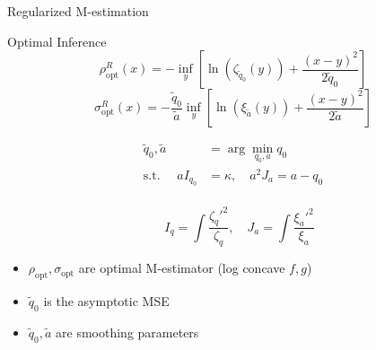 \documentclass[pdf]{beamer}
\begin{document}
\begin{frame}{Regularized M-estimation}

\begin{block}{Optimal Inference}
\begin{equation*}
 \rho_{\text{opt}}^R(x) =  -\inf_y{\left[ \ln(\zeta_{\tilde{q}_0}(y)) + \frac{(x-y)^2}{2 \tilde{q}_0}\right]}
\end{equation*}
\begin{equation*}
\sigma_{\text{opt}}^{R}(x)=-\frac{\tilde{q}_0}{\tilde{a}}\inf_y{\left[ \ln(\xi_{\tilde{a}}(y)) +\frac{(x-y)^2}{2 \tilde{a}}\right]} \label{optReg}
\end{equation*}


\parbox{.45\linewidth}{
\begin{equation*}
\begin{split}
\tilde{q}_0,\tilde{a} &= \arg\min_{q_0,a}{q_0} \\
\text{s.t. }\quad  a I_{q_0} & = \kappa,\quad a^2 J_a = a-q_0 \\
\label{unregopt}
\end{split}
\end{equation*}
}
\parbox{.45\linewidth}{
\begin{equation*}
\quad I_{q} = \int{\frac{\zeta_q'^2}{\zeta_q}}, \quad J_{a} = \int{\frac{\xi_a'^2}{\xi_a}}
\end{equation*}
}


\begin{itemize}
\item $\rho_{\text{opt}},\sigma_{\text{opt}}$ are optimal M-estimator (log concave $f,g$)

\item $\tilde{q}_0$ is the asymptotic MSE
\item $\tilde{q}_0,\tilde{a}$ are smoothing parameters
\end{itemize}
\end{block}
\end{frame}
\end{document}
